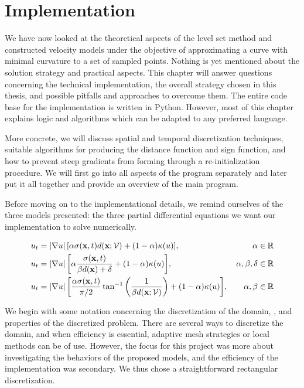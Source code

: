\chapter{Implementation}\label{chap:implementation}
We have now looked at the theoretical aspects of the level set method and constructed velocity models under the objective of approximating a curve with minimal curvature to a set of sampled points. Nothing is yet mentioned about the solution strategy and practical aspects. This chapter will answer questions concerning the technical implementation, the overall strategy chosen in this thesis, and possible pitfalls and approaches to overcome them. The entire code base for the implementation is written in Python. However, most of this chapter explains logic and algorithms which can be adapted to any preferred language.

More concrete, we will discuss spatial and temporal discretization techniques, suitable algorithms for producing the distance function and sign function, and how to prevent steep gradients from forming through a re-initialization procedure. We will first go into all aspects of the program separately and later put it all together and provide an overview of the main program.

Before moving on to the implementational details, we remind ourselves of the three models presented: the three partial differential equations we want our implementation to solve numerically.

\begin{alignat}{2}
    u_t &= |\nabla u|\,[\alpha\sigma(\mathbf{x}, t) d(\mathbf{x}; \mathcal{V}) + (1-\alpha) \kappa(u)], &\alpha \in \mathbb{R} \label{eq:m1-imp}\\
    u_t &= |\nabla u|\, \bigg[\alpha \frac{ \sigma(\mathbf{x}, t)}{\beta d(\mathbf{x})+\delta} + (1-\alpha)\kappa (u) \bigg], &\alpha, \beta, \delta \in \mathbb{R} \label{eq:m2-imp}\\
    u_t &= |\nabla u|\, \bigg[ \frac{\alpha \sigma(\mathbf{x}, t)}{\pi/2} \tan^{-1}\bigg(\frac{1}{\beta d(\textbf{x};\mathcal{V})}\bigg) + (1-\alpha)\kappa (u) \bigg], \, &\alpha, \beta \in \mathbb{R} \label{eq:m3-imp}
\end{alignat}

We begin with some notation concerning the discretization of the domain, \domain, and properties of the discretized problem. There are several ways to discretize the domain, and when efficiency is essential, adaptive mesh strategies or local methods can be of use. However, the focus for this project was more about investigating the behaviors of the proposed models, and the efficiency of the implementation was secondary. We thus chose a straightforward rectangular discretization.

